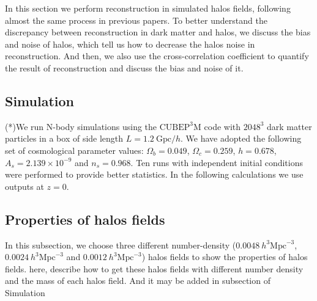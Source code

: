 
In this section we perform reconstruction in simulated halos fields,
following almost the same process in previous papers. 
To better understand the discrepancy between reconstruction in dark matter and
halos, we discuss the bias and noise of halos, which tell us how to decrease
the halos noise in reconstruction. And then, we also use the 
cross-correlation coefficient to quantify the result of reconstruction 
and discuss the bias and noise of it.\\

\subsection{Simulation}
{\color{red}(*)}We run N-body simulations using the $\mathrm{CUBEP^3M}$ code with $2048^3$
 dark matter particles in a box of side length $L=1.2\ \mathrm{Gpc}/h$.
  We have
 adopted the following set of cosmological parameter values:
 $\Omega_{b}=0.049$, $\Omega_{c}=0.259$, $h=0.678$, 
 $A_s=2.139\times 10^{-9}$ and $n_s=0.968$.
 Ten runs with independent initial conditions were performed to provide
  better statistics. In the following calculations we use outputs 
  at $z=0$. \\
\subsection{\label{property_h}Properties of halos fields}
In this subsection, we choose three different number-density
($0.0048\ h^{3}\mathrm{Mpc}^{-3}$, 
$0.0024\ h^{3}\mathrm{Mpc}^{-3}$ and $0.0012\ h^{3}\mathrm{Mpc}^{-3}$)
 halos fields to show the properties of halos fields.
{\color{red} here, describe how to get these halos fields with different 
number density and the mass of each halos field. And it may be added in subsection of Simulation} \\


